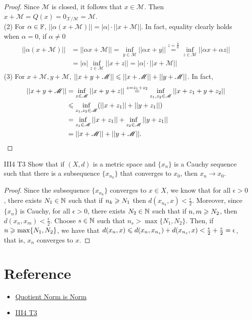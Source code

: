 \begin{proof}
        Since $\mathscr{M}$ is closed, it follows that $x\in\mathscr{M}$. Then $x+\mathscr{M}=Q(x)=0_{\mathscr{X}/\mathscr{M}}=\mathscr{M}$.\\
    (2) For $\alpha\in\mathbb{F}$, $||\alpha (x+\mathscr{M})||=|\alpha|\cdot||x+\mathscr{M}||$. In fact, equality clearly holds when $\alpha=0$, if $\alpha\neq 0$
    \begin{align*}
        ||\alpha(x+\mathscr{M})||&=||\alpha x+\mathscr{M}||=\inf_{y\in\mathscr{M}}||\alpha x+y||\overset{z=\frac{y}{\alpha}}{=}\inf_{z\in\mathscr{M}}||\alpha x+\alpha z||\\
                                &=|\alpha|\inf_{z\in\mathscr{M}} ||x+z|| =|\alpha|\cdot||x+\mathscr{M}||
    \end{align*}
    (3) For $x+\mathscr{M},y+\mathscr{M}$, $||x+y+\mathscr{M}||\leqslant ||x+\mathscr{M}||+||y+\mathscr{M}||$. In fact,
    \begin{align*}
        ||x+y+\mathscr{M}||&=\inf_{z\in \mathscr{M}}||x+y+z||\overset{z=z_1+z_2}{=}\inf_{z_1,z_2\in \mathscr{M}}||x+z_1+y+z_2||\\
                        &\leqslant \inf_{z_1,z_2\in \mathscr{M}} (||x+z_1||+||y+z_1||)\\
                        &=\inf_{z_1\in\mathscr{M}}||x+z_1|| + \inf_{z_2\in\mathscr{M}}||y+z_1||\\
                        &= ||x+\mathscr{M}||+||y+\mathscr{M}||.
    \end{align*}


\end{proof}

\begin{exercise}{III4 T3}{}
    Show that if $(X,d)$ is a metric space and $\{x_n\}$ is a Cauchy sequence such that
    there is a subsequence $\{x_{n_k}\}$ that converges to $x_0$, then $x_n\rightarrow x_0$.
\end{exercise}
\begin{proof}
    Since the subsequence $\{x_{n_k}\}$ converges to $x\in X$, we know that for all $\epsilon>0$,
    there exists $N_1\in\mathbb{N}$ such that if $n_k\geqslant N_1$ then $d(x_{n_k},x)<\frac{\epsilon}{2}$.
    Moreover, since $\{x_n\}$ is Cauchy, for all $\epsilon>0$,
    there exists $N_2\in\mathbb{N}$ such that if $n,m\geqslant N_2$, then $d(x_n,x_m)<\frac{\epsilon}{2}$.
    Choose $s\in\mathbb{N}$ such that $n_s>\max \{N_1,N_2\}$.
    Then, if $n\geqslant \max \{N_1,N_2\}$, we have that 
    $d(x_n,x)\leqslant d(x_n,x_{n_s})+d(x_{n_s},x)<\frac{\epsilon}{2}+\frac{\epsilon}{2}=\epsilon$,
    that is, $x_n$ converges to $x$.
\end{proof}


\section{Reference}

\begin{itemize}
    \item \href{https://proofwiki.org/wiki/Quotient_Norm_is_Norm}{Quotient Norm is Norm}
    \item \href{https://www.lehman.edu/faculty/rbettiol/lehman_teaching/2020mat320/HW3sol.pdf}{III4 T3}
\end{itemize}

